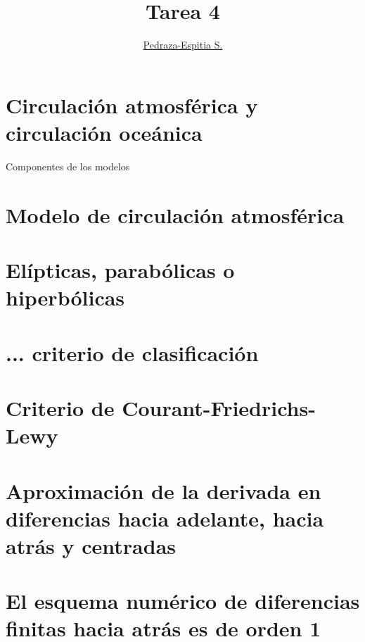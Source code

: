 \documentclass{article}
\title{Tarea 4}
\author{\href{https://git.io/salvador}{Pedraza-Espitia S.}}
\date{}
\begin{document}
\maketitle

\section{Circulación atmosférica y circulación oceánica}
Componentes de los modelos

\section{Modelo de circulación atmosférica}

\section{Elípticas, parabólicas o hiperbólicas}

\section{... criterio de clasificación}

\section{Criterio de Courant-Friedrichs-Lewy}

\newcommand\derord[3][]{
\def\temp{#1}\ifx\temp\empty
	\ensuremath {\left( \dfrac{\mathrm{d}#2}{\mathrm{d}#3}} \right)_j%
\else
	\ensuremath {\left( \dfrac{\mathrm{d}^#1#2}{\mathrm{d}#3^#1}} \right)_j%
\fi}
\newcommand\Dt{\ensuremath {\left( \Delta t \right)}}
\newcommand\Dx{\ensuremath {\left( \Delta x \right)}}
\newcommand\dDx{\ensuremath {\left( 2\Delta x \right)}}
\newcommand\dxdero[3]{\ensuremath {\Dt^{\the\numexpr #3 - 1\relax} \derord[#3]{#1}{#2} }}

\section{Aproximación de la derivada en diferencias hacia adelante, hacia atrás y centradas}

\section{El esquema numérico de diferencias finitas hacia atrás es de orden 1}
\end{document}
